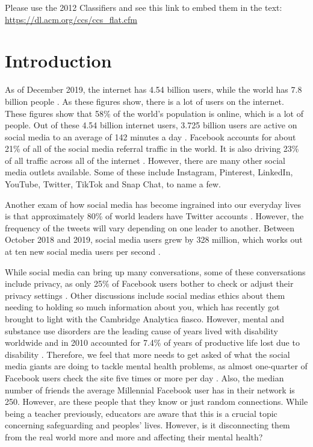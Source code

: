 \documentclass{sigchi}
\begin{document}
\printccsdesc
Please use the 2012 Classifiers and see this link to embed them in the text: \url{https://dl.acm.org/ccs/ccs_flat.cfm}



\section{Introduction}
	As of December 2019, the internet has 4.54 billion users, while the world has 7.8 billion people \cite{126_sm_facts}. As these figures show, there is a lot of users on the internet. These figures show that 58\% of the world's population is online, which is a lot of people. Out of these 4.54 billion internet users, 3.725 billion users are active on social media to an average of 142 minutes a day \cite{126_sm_facts}. Facebook accounts for about 21\% of all of the social media referral traffic in the world. It is also driving 23\% of all traffic across all of the internet \cite{47_sm_facts, 126_sm_facts}. However, there are many other social media outlets available. Some of these include Instagram, Pinterest, LinkedIn, YouTube, Twitter, TikTok and Snap Chat, to name a few.
	
	Another exam of how social media has become ingrained into our everyday lives is that approximately 80\% of world leaders have Twitter accounts \cite{47_sm_facts}. However, the frequency of the tweets will vary depending on one leader to another. Between October 2018 and 2019, social media users grew by 328 million, which works out at ten new social media users per second \cite{126_sm_facts}.
	
	While social media can bring up many conversations, some of these conversations include privacy, as only 25\% of Facebook users bother to check or adjust their privacy settings \cite{47_sm_facts}. Other discussions include social medias ethics about them needing to holding so much information about you, which has recently got brought to light with the Cambridge Analytica fiasco. However, mental and substance use disorders are the leading cause of years lived with disability worldwide and in 2010 accounted for 7.4\% of years of productive life lost due to disability \cite{gkotsis2017characterisation}. Therefore, we feel that more needs to get asked of what the social media giants are doing to tackle mental health problems, as almost one-quarter of Facebook users check the site five times or more per day \cite{47_sm_facts}. Also, the median number of friends the average Millennial Facebook user has in their network is 250. However, are these people that they know or just random connections. While being a teacher previously, educators are aware that this is a crucial topic concerning safeguarding and peoples' lives. However, is it disconnecting them from the real world more and more and affecting their mental health?
	
\end{document}
